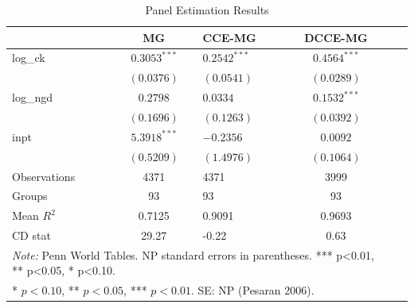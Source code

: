 
\begin{table}[htbp]
  \centering
  \caption{Panel Estimation Results}
  \label{tab:results_multi}
  \begin{tabular}{lclclc}
  \hline\hline
  & MG & CCE-MG & DCCE-MG \\
  \hline
  log\_ck & $0.3053^{***}$ & $0.2542^{***}$ & $0.4564^{***}$ \\ 
   & $(0.0376)$ & $(0.0541)$ & $(0.0289)$ \\[4pt]
  log\_ngd & $0.2798$ & $0.0334$ & $0.1532^{***}$ \\ 
   & $(0.1696)$ & $(0.1263)$ & $(0.0392)$ \\[4pt]
  inpt & $5.3918^{***}$ & $-0.2356$ & $0.0092$ \\ 
   & $(0.5209)$ & $(1.4976)$ & $(0.1064)$ \\[4pt]
  \hline
  Observations & 4371 & 4371 & 3999 \\
  Groups & 93 & 93 & 93 \\
  Mean $R^2$ & 0.7125 & 0.9091 & 0.9693 \\
  CD stat & 29.27 & -0.22 & 0.63 \\
  \hline\hline
  \multicolumn{4}{l}{\textit{Note:} Penn World Tables. NP standard errors in parentheses. *** p<0.01, ** p<0.05, * p<0.10.} \\
  \multicolumn{4}{l}{* $p<0.10$, ** $p<0.05$, *** $p<0.01$. SE: NP (Pesaran 2006).} \\
  \end{tabular}
\end{table}
